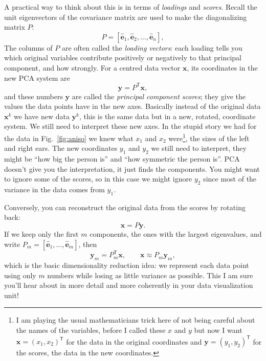 \documentclass[12pt]{article}
\begin{document}
A practical way to think about this is in terms of \emph{loadings} and
\emph{scores}. Recall the unit eigenvectors of the covariance matrix
are used to make the diagonalizing matrix $P$:
\begin{equation}
P=[\hat{\mathbf{e}}_1,\hat{\mathbf{e}}_2,\ldots,\hat{\mathbf{e}}_n],
\end{equation}
The columns of $P$ are often called the \emph{loading vectors}: each loading tells you which original variables contribute positively or negatively to that principal component, and how strongly. For a centred data vector $\mathbf{x}$, its coordinates in the new PCA system are
\begin{equation}
\mathbf{y}=P^{\mathsf T}\mathbf{x},
\end{equation}
and these numbers $\mathbf{y}$ are called the \emph{principal
component scores}; they give the values the data points have in the
new axes. Basically instead of the original data $\mathbf{x}^k$ we
have new data $\mathbf{y}^k$, this is the same data but in a new,
rotated, coordinate system. We still need to interpret these new
axes. In the stupid story we had for the data in Fig.~\ref{fig:aniso}
we knew what $x_1$ and $x_2$ were\footnote{I am playing the usual
mathematicians trick here of not being careful about the names of the
variables, before I called these $x$ and $y$ but now I want
$\mathbf{x}=(x_1,x_2)^{\mathsf T}$ for the data in the original
coordinates and $\mathbf{y}=(y_1,y_2)^{\mathsf T}$ for the scores, the
data in the new coordinates.}, the sizes of the left and right
ears. The new coordinates $y_1$ and $y_2$ we still need to interpret,
they might be ``how big the person is'' and ``how symmetric the person
is''. PCA doesn't give you the interpretation, it just finds the
components. You might want to ignore some of the scores, so in this
case we might ignore $y_2$ since most of the variance in the data
comes from $y_1$.


Conversely, you can reconstruct the original data from the scores by rotating back:
\begin{equation}
\mathbf{x}=P\mathbf{y}.
\end{equation}
If we keep only the first $m$ components, the ones with the largest eigenvalues, and write $P_m=[\hat{\mathbf{e}}_1,\ldots,\hat{\mathbf{e}}_m]$, then
\begin{equation}
\mathbf{y}_m=P_m^{\mathsf T}\mathbf{x},
\qquad
\mathbf{x}\approx P_m\mathbf{y}_m,
\end{equation}
which is the basic dimensionality reduction idea: we represent each
data point using only $m$ numbers while losing as little variance as
possible. This I am sure you'll hear about in more detail and more
coherently in your data visualization unit!
\end{document}
